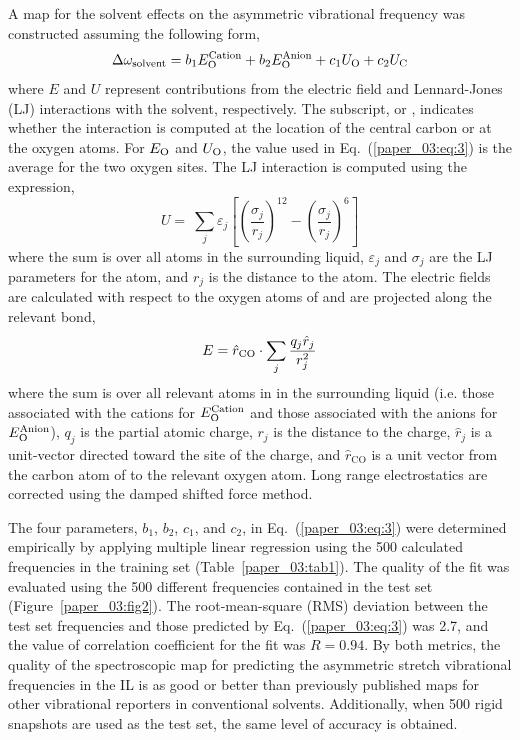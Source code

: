 \documentclass[%
  class = book,%
  crop = false,%
  float = true,%
  multi = true,%
  preview = false,%
]{standalone}
\begin{document}
A map for the solvent effects on the asymmetric  vibrational frequency was constructed assuming the following form,
\begin{equation}
  \label{paper_03:eq:3}
  \Delta\omega_{\text{solvent}} = b_{1}E_{\ce{O}}^{\text{Cation}} + b_{2}E_{\ce{O}}^{\text{Anion}} + c_{1}U_{\ce{O}} + c_{2}U_{\ce{C}}
\end{equation}
where \(E\) and \(U\) represent contributions from the electric field and Lennard-Jones (LJ) interactions with the solvent, respectively. The subscript,  or , indicates whether the interaction is computed at the location of the  central carbon or at the oxygen atoms. For \(E_{\ce{O}}\) and \(U_{\ce{O}}\), the value used in Eq.~(\ref{paper_03:eq:3}) is the average for the two  oxygen sites. The LJ interaction is computed using the expression,
\begin{equation}
  \label{paper_03:eq:4}
  U = \ \sum_{j}^{}\varepsilon_{j}\left\lbrack \left( \frac{\sigma_{j}}{r_{j}} \right)^{12} - \left( \frac{\sigma_{j}}{r_{j}} \right)^{6} \right\rbrack
\end{equation}
where the sum is over all atoms in the surrounding liquid, \(\varepsilon_{j}\) and \(\sigma_{j}\) are the LJ parameters for the atom, and \(r_{j}\) is the distance to the atom. The electric fields are calculated with respect to the oxygen atoms of  and are projected along the relevant  bond,
\begin{equation}
  \label{paper_03:eq:5}
  E = {\hat{r}}_{\ce{CO}} \cdot \sum_{j}^{}\frac{q_{j}{\hat{r}}_{j}}{r_{j}^{2}}
\end{equation}
where the sum is over all relevant atoms in in the surrounding liquid (i.e. those associated with the cations for \(E_{\ce{O}}^{\text{Cation}}\) and those associated with the anions for \(E_{\ce{O}}^{\text{Anion}}\)), \(q_{j}\) is the partial atomic charge, \(r_{j}\) is the distance to the charge, \({\hat{r}}_{j}\) is a unit-vector directed toward the site of the charge, and \({\hat{r}}_{\mathrm{\text{CO}}}\) is a unit vector from the carbon atom of  to the relevant oxygen atom. Long range electrostatics are corrected using the damped shifted force method.\cite{fennell_is_2006}

The four parameters, \(b_{1}\), \(b_{2}\), \(c_{1}\), and \(c_{2}\), in Eq.~(\ref{paper_03:eq:3}) were determined empirically by applying multiple linear regression using the \num{500} calculated frequencies in the training set (Table~\ref{paper_03:tab1}). The quality of the fit was evaluated using the \num{500} different frequencies contained in the test set (Figure~\ref{paper_03:fig2}). The root-mean-square (RMS) deviation between the test set frequencies and those predicted by Eq.~(\ref{paper_03:eq:3}) was \SI{2.7}{\wavenumber}, and the value of correlation coefficient for the fit was \(R = 0.94\). By both metrics, the quality of the spectroscopic map for predicting the  asymmetric stretch vibrational frequencies in the \ce{[C4C1im][PF6]} IL is as good or better than previously published maps for other vibrational reporters in conventional solvents. Additionally, when \num{500} rigid  snapshots are used as the test set, the same level of accuracy is obtained.
\end{document}
